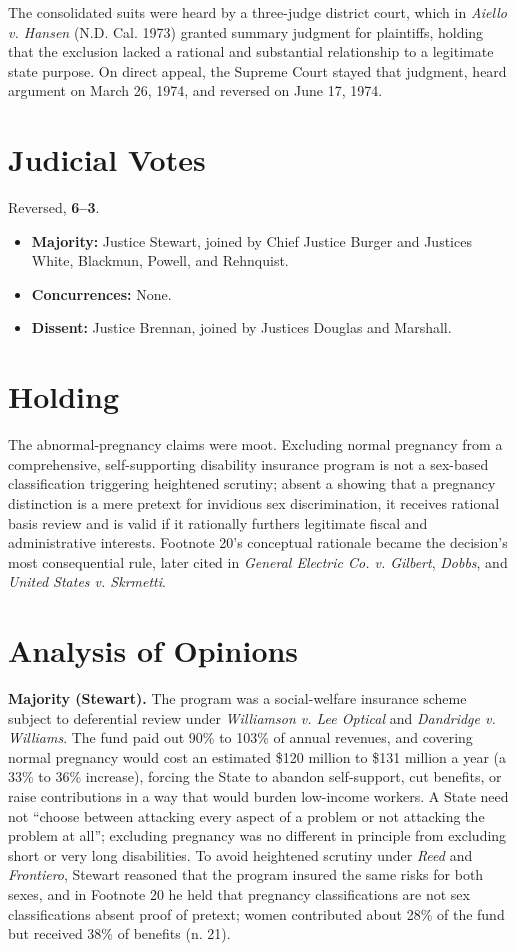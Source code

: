 \documentclass[12pt]{article}
\begin{document}
The consolidated suits were heard by a three-judge district court, which in \textit{Aiello v. Hansen} (N.D. Cal. 1973) granted summary judgment for plaintiffs, holding that the exclusion lacked a rational and substantial relationship to a legitimate state purpose. On direct appeal, the Supreme Court stayed that judgment, heard argument on March 26, 1974, and reversed on June 17, 1974.

\section{Judicial Votes}

Reversed, \textbf{6--3}.
\begin{itemize}
\item \textbf{Majority:} Justice Stewart, joined by Chief Justice Burger and Justices White, Blackmun, Powell, and Rehnquist.
\item \textbf{Concurrences:} None.
\item \textbf{Dissent:} Justice Brennan, joined by Justices Douglas and Marshall.
\end{itemize}

\section{Holding}

The abnormal-pregnancy claims were moot. Excluding normal pregnancy from a comprehensive, self-supporting disability insurance program is not a sex-based classification triggering heightened scrutiny; absent a showing that a pregnancy distinction is a mere pretext for invidious sex discrimination, it receives rational basis review and is valid if it rationally furthers legitimate fiscal and administrative interests. Footnote 20's conceptual rationale became the decision's most consequential rule, later cited in \textit{General Electric Co. v. Gilbert}, \textit{Dobbs}, and \textit{United States v. Skrmetti}.

\section{Analysis of Opinions}

\textbf{Majority (Stewart).} The program was a social-welfare insurance scheme subject to deferential review under \textit{Williamson v. Lee Optical} and \textit{Dandridge v. Williams}. The fund paid out 90\% to 103\% of annual revenues, and covering normal pregnancy would cost an estimated \$120 million to \$131 million a year (a 33\% to 36\% increase), forcing the State to abandon self-support, cut benefits, or raise contributions in a way that would burden low-income workers. A State need not ``choose between attacking every aspect of a problem or not attacking the problem at all''; excluding pregnancy was no different in principle from excluding short or very long disabilities. To avoid heightened scrutiny under \textit{Reed} and \textit{Frontiero}, Stewart reasoned that the program insured the same risks for both sexes, and in Footnote 20 he held that pregnancy classifications are not sex classifications absent proof of pretext; women contributed about 28\% of the fund but received 38\% of benefits (n. 21).
\end{document}
